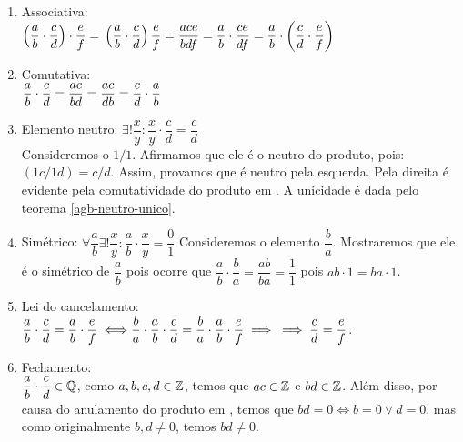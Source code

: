 \documentclass[../main.tex]{subfiles}
\begin{document}
\begin{dem}
    \begin{enumerate}[label=(\roman*)]
        \item Associativa: \\
            $\left( \dfrac{a}{b} \cdot \dfrac{c}{d}\right) \cdot \dfrac{e}{f} = \\
            \left(\dfrac{a}{b} \cdot \dfrac{c}{d}\right) \dfrac{e}{f} = \\
            \dfrac{ace}{bdf} = \dfrac{a}{b} \cdot \dfrac{ce}{df} = \\
            \dfrac{a}{b} \cdot \left(\dfrac{c}{d} \cdot \dfrac{e}{f}\right)$
            
        
        \item Comutativa: \\
            $\dfrac{a}{b} \cdot \dfrac{c}{d} = \\
            \dfrac{ac}{bd} = \\
            \dfrac{ac}{db} = \\
            \dfrac{c}{d} \cdot \dfrac{a}{b}$
        
        \item Elemento neutro: $\exists! \dfrac{x}{y} : \dfrac{x}{y} \cdot \dfrac{c}{d} =     \dfrac{c}{d}$ \\
        Consideremos o $1/1$. Afirmamos que ele é o neutro do produto, pois: $\left(1c/1d \right) = c/d$.
        Assim, provamos que é neutro pela esquerda. Pela direita é evidente pela comutatividade do produto em \Z. A unicidade é dada pelo teorema \ref{agb-neutro-unico}.
        
        \item Simétrico: $\forall \dfrac{a}{b} \exists! \dfrac{x}{y} :  \dfrac{a}{b} \cdot \dfrac{x}{y} = \dfrac{0}{1}$
        Consideremos o elemento $\dfrac{b}{a}$. Mostraremos que ele é o simétrico de $\dfrac{a}{b}$ pois ocorre que $\dfrac{a}{b} \cdot \dfrac{b}{a} = \dfrac{ab}{ba} = \dfrac{1}{1}$ pois $ab\cdot 1 = ba\cdot 1$.
        
        \item Lei do cancelamento: \\
            $\dfrac{a}{b} \cdot \dfrac{c}{d} = \dfrac{a}{b} \cdot \dfrac{e}{f} \iff \\
            \dfrac{b}{a} \cdot \dfrac{a}{b} \cdot \dfrac{c}{d} = \dfrac{b}{a} \cdot  \dfrac{a}{b} \cdot \dfrac{e}{f} \implies \\
            \implies \dfrac{c}{d} = \dfrac{e}{f}$.
            
        \item Fechamento: \\
        $\dfrac{a}{b} \cdot \dfrac{c}{d} \in \mathbb{Q}$, como $a,b,c,d \in \mathbb{Z}$, temos que $ac \in \mathbb{Z}$ e $bd \in \mathbb{Z}$. Além disso, por causa do anulamento do produto em \Z, temos que $bd = 0 \iff b = 0 \lor d = 0$, mas como originalmente $b,d \neq 0$, temos $bd \neq 0$.
    \end{enumerate}    
\end{dem}
\end{document}
